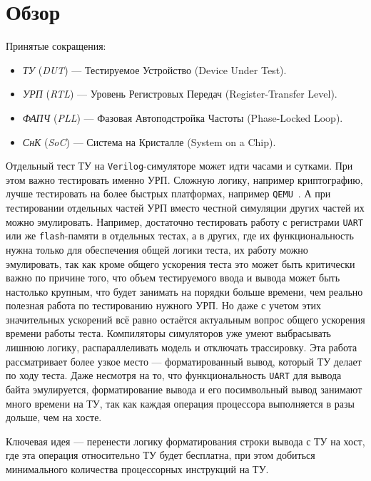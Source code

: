 
\section{Обзор}
\label{sec:relatedworks}

Принятые сокращения:

\begin{itemize}
    \item \textit{ТУ} (\textit{DUT}) --- Тестируемое Устройство (Device Under Test).
    \item \textit{УРП} (\textit{RTL}) --- Уровень Регистровых Передач (Register-Transfer Level).
    \item \textit{ФАПЧ} (\textit{PLL}) --- Фазовая Автоподстройка Частоты (Phase-Locked Loop).
    \item \textit{СнК} (\textit{SoC}) --- Система на Кристалле (System on a Chip).
\end{itemize}

Отдельный тест ТУ на \texttt{Verilog}-симуляторе может идти часами и сутками.
При этом важно тестировать именно УРП. Сложную логику, например криптографию, лучше тестировать на более быстрых платформах, например \texttt{QEMU}~\cite{Bellard05QEMU}.
А при тестировании отдельных частей УРП вместо честной симуляции других частей их можно эмулировать.
Например, достаточно тестировать работу с регистрами \texttt{UART} или же \texttt{flash}-памяти в отдельных тестах, а в других, где их функциональность нужна только для обеспечения общей логики теста, их работу можно эмулировать, так как кроме общего ускорения теста это может быть критически важно по причине того, что объем тестируемого ввода и вывода может быть настолько крупным, что будет занимать на порядки больше времени, чем реально полезная работа по тестированию нужного УРП.
Но даже с учетом этих значительных ускорений всё равно остаётся актуальным вопрос общего ускорения времени работы теста.
Компиляторы симуляторов уже умеют выбрасывать лишнюю логику, распараллеливать модель и отключать трассировку.
Эта работа рассматривает более узкое место --- форматированный вывод, который ТУ делает по ходу теста. Даже несмотря на то, что функциональность \texttt{UART} для вывода байта эмулируется, форматирование вывода и его посимвольный вывод занимают много времени на ТУ, так как каждая операция процессора выполняется в разы дольше, чем на хосте.

Ключевая идея --- перенести логику форматирования строки вывода с ТУ на хост, где эта операция относительно ТУ будет бесплатна, при этом добиться минимального количества процессорных инструкций на ТУ.

